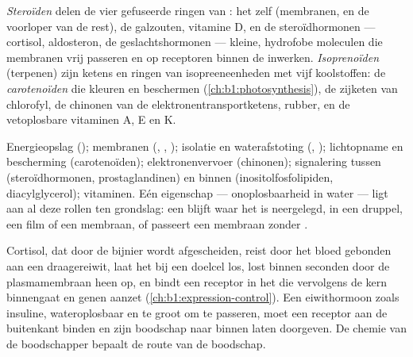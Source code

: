 \begin{definition}\label{def:b1:lipids:steroids}
\emph{Steroïden} delen de vier gefuseerde ringen van :
het  zelf (membranen, en de voorloper van de rest), de galzouten,
vitamine D, en de steroïdhormonen --- cortisol, aldosteron, de
geslachtshormonen --- kleine, hydrofobe moleculen die membranen vrij passeren en
op receptoren binnen de  inwerken. \emph{Isoprenoïden}
(terpenen) zijn ketens en ringen van isopreeneenheden met vijf koolstoffen: de
\emph{carotenoïden} die  kleuren en  beschermen
(\cref{ch:b1:photosynthesis}), de zijketen van chlorofyl, de chinonen van de
elektronentransportketens, rubber, en de vetoplosbare vitaminen A, E en K.
\end{definition}

\begin{proposition}\label{prop:b1:lipids:functions}
Energieopslag (); membranen (, , );
isolatie en waterafstoting (, ); lichtopname en bescherming
(carotenoïden); elektronenvervoer (chinonen); signalering tussen 
(steroïdhormonen, prostaglandinen) en binnen  (inositolfosfolipiden,
diacylglycerol); vitaminen. Eén eigenschap --- onoplosbaarheid in water --- ligt
aan al deze rollen ten grondslag: een  blijft waar het is neergelegd, in een
druppel, een film of een membraan, of passeert een membraan zonder .
\end{proposition}

\begin{example}\label{ex:b1:lipids:steroidhormone}
Cortisol, dat door de bijnier wordt afgescheiden, reist door het bloed gebonden aan
een draagereiwit, laat het bij een doelcel los, lost binnen seconden door de
plasmamembraan heen op, en bindt een receptor in het  die vervolgens de
kern binnengaat en genen aanzet (\cref{ch:b1:expression-control}). Een
eiwithormoon zoals insuline, wateroplosbaar en te groot om te passeren, moet een
receptor aan de buitenkant binden en zijn boodschap naar binnen laten doorgeven.
De chemie van de boodschapper bepaalt de route van de boodschap.
\end{example}

